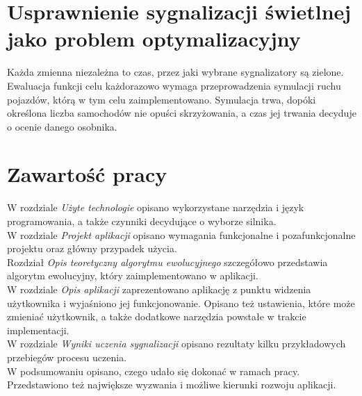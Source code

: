 \section*{Usprawnienie sygnalizacji świetlnej jako problem optymalizacyjny}
Każda zmienna niezależna to czas, przez jaki wybrane sygnalizatory są zielone. Ewaluacja funkcji celu każdorazowo wymaga przeprowadzenia symulacji ruchu pojazdów, którą w tym celu zaimplementowano. Symulacja trwa, dopóki określona liczba samochodów nie opuści skrzyżowania, a czas jej trwania decyduje o ocenie danego osobnika. \\
\section*{Zawartość pracy}
W rozdziale \textit{Użyte technologie} opisano wykorzystane narzędzia i język programowania, a także czynniki decydujące o wyborze silnika.\\
W rozdziale \textit{Projekt aplikacji} opisano wymagania funkcjonalne i pozafunkcjonalne projektu oraz główny przypadek użycia.\\
Rozdział \textit{Opis teoretyczny algorytmu ewolucyjnego} szczegółowo przedstawia algorytm ewolucyjny, który zaimplementowano w aplikacji.\\
W rozdziale \textit{Opis aplikacji} zaprezentowano aplikację z punktu widzenia użytkownika i wyjaśniono jej funkcjonowanie. Opisano też ustawienia, które może zmieniać użytkownik, a także dodatkowe narzędzia powstałe w trakcie implementacji.\\
W rozdziale \textit{Wyniki uczenia sygnalizacji} opisano rezultaty kilku przykładowych przebiegów procesu uczenia.\\
W podsumowaniu opisano, czego udało się dokonać w ramach pracy. Przedstawiono też największe wyzwania i możliwe kierunki rozwoju aplikacji.